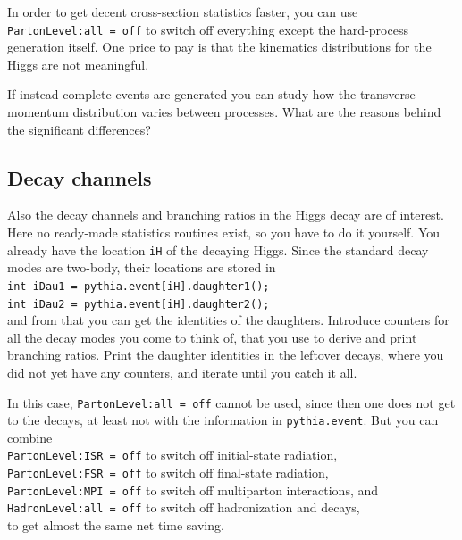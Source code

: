 \documentclass[12pt,a4paper]{article}
\begin{document}
In order to get decent cross-section statistics faster, you can use 
\texttt{PartonLevel:all = off} to switch off everything except the 
hard-process generation itself. One price to pay is that the 
kinematics distributions for the Higgs are not meaningful.

If instead complete events are generated you can study how the
transverse-momentum distribution varies between processes.
What are the reasons behind the significant differences? 

\subsection{Decay channels}

Also the decay channels and branching ratios in the Higgs
decay are of interest. Here no ready-made statistics routines
exist, so you have to do it yourself. You already have the location
\texttt{iH} of the decaying Higgs. Since the standard decay modes
are two-body, their locations are stored in\\  
\hspace*{10mm}\texttt{int iDau1 = pythia.event[iH].daughter1();}\\
\hspace*{10mm}\texttt{int iDau2 = pythia.event[iH].daughter2();}\\
and from that you can get the identities of the daughters.
Introduce counters for all the decay modes you come to think of,
that you use to derive and print branching ratios. Print the 
daughter identities in the leftover decays, where you did not yet 
have any counters, and iterate until you catch it all.
 
In this case, \texttt{PartonLevel:all = off} cannot be used, since 
then one does not get to the decays, at least not with the 
information in \texttt{pythia.event}. But you can combine\\
\hspace*{10mm}\texttt{PartonLevel:ISR = off} to switch off 
initial-state radiation,\\
\hspace*{10mm}\texttt{PartonLevel:FSR = off} to switch off 
final-state radiation,\\
\hspace*{10mm}\texttt{PartonLevel:MPI = off} to switch off 
multiparton interactions, and\\
\hspace*{10mm}\texttt{HadronLevel:all = off} to switch off 
hadronization and decays,\\
to get almost the same net time saving.
\end{document}
